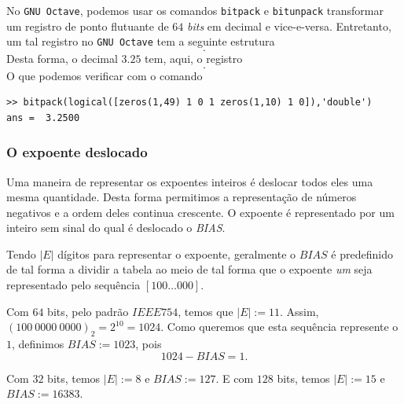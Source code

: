 \ifisoctave
\begin{obs}
  No \verb+GNU Octave+, podemos usar os comandos \verb+bitpack+ e \verb+bitunpack+ transformar um registro de ponto flutuante de $64$ \emph{bits} em decimal e vice-e-versa. Entretanto, um tal registro no \verb+GNU Octave+ tem a seguinte estrutura
  \begin{equation*}
    [m_{52}m_{51}m_{50}\ldots m_{1}|c_0c_1c_2\cdots c_{10}|s].
  \end{equation*}
Desta forma, o decimal $3.25$ tem, aqui, o registro
\begin{equation*}
  [000\ldots 0101|000\ldots 01|0].
\end{equation*}
O que podemos verificar com o comando
\begin{verbatim}
>> bitpack(logical([zeros(1,49) 1 0 1 zeros(1,10) 1 0]),'double')
ans =  3.2500
\end{verbatim}
\end{obs}
\fi

\subsubsection{O expoente deslocado}

Uma maneira de representar os expoentes inteiros é deslocar todos eles uma mesma quantidade. Desta forma permitimos a representação de números negativos e a ordem deles continua crescente. O expoente é representado por um inteiro sem sinal do qual é deslocado o \emph{BIAS}.

Tendo $|E|$ dígitos para representar o expoente, geralmente o $BIAS$ é predefinido de tal forma a dividir a tabela ao meio de tal forma que o expoente \textit{um} seja representado pelo sequência $[100\ldots 000]$. 

\begin{ex}
  Com $64$ bits, pelo padrão $IEEE754$, temos que $|E|:=11$. Assim, $(100~0000~0000)_2=2^{10}=1024$. Como queremos que esta sequência represente o $1$, definimos $BIAS:=1023$, pois
  $$ 1024-BIAS=1.$$

  Com $32$ bits, temos $|E|:=8$ e $BIAS:=127$. E com $128$ bits, temos $|E|:=15$ e $BIAS:=16383$.
\end{ex}

